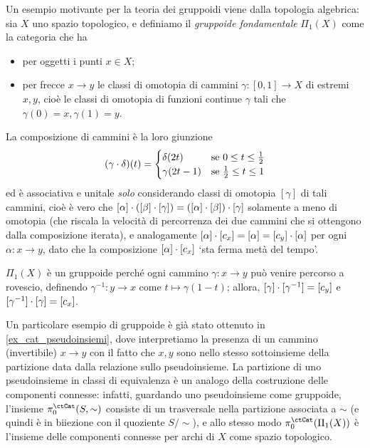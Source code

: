 \begin{definition}\label{es_gruppoide_fondamentale}
 Un esempio motivante per la teoria dei gruppoidi viene dalla topologia algebrica: sia \(X\) uno spazio topologico, e definiamo il \emph{gruppoide fondamentale} \(\Pi_1(X)\) come la categoria che ha
 \begin{itemize}
  \item per oggetti i punti \(x\in X\);
  \item per frecce \(x\to y\) le classi di omotopia di cammini \(\gamma \colon [0,1] \to X\) di estremi \(x,y\), cioè le classi di omotopia di funzioni continue \(\gamma\) tali che \(\gamma(0)=x, \gamma(1)=y\).
 \end{itemize}
 La composizione di cammini è la loro giunzione
 \[
  (\gamma\cdot \delta)(t) =
  \begin{cases}
   \delta(2t)   & \text{se } 0\le t\le \frac 12  \\
   \gamma(2t-1) & \text{se } \frac 12 \le t\le 1 \\
  \end{cases}\]
 ed è associativa e unitale \emph{solo} considerando classi di omotopia \([\gamma]\) di tali cammini, cioè è vero che \([\alpha] \cdot \left([\beta] \cdot [\gamma]\right) = \left([\alpha] \cdot [\beta]\right) \cdot [\gamma]\) solamente a meno di omotopia (che riscala la velocità di percorrenza dei due cammini che si ottengono dalla composizione iterata), e analogamente \([\alpha]\cdot [c_x] = [\alpha] = [c_y]\cdot [\alpha]\) per ogni \(\alpha \colon x\to y\), dato che la composizione \([\alpha]\cdot [c_x]\) `sta ferma metà del tempo'.

 \(\Pi_1(X)\) è un gruppoide perché ogni cammino \(\gamma \colon x\to y\) può venire percorso a rovescio, definendo \(\gamma^{-1} \colon y\to x\) come \(t\mapsto\gamma(1-t)\); allora, \([\gamma]\cdot[\gamma^{-1}] = [c_y]\) e \([\gamma^{-1}]\cdot [\gamma] = [c_x]\).
\end{definition}
Un particolare esempio di gruppoide è già stato ottenuto in \ref{ex_cat_pseudoinsiemi}, dove interpretiamo la presenza di un cammino (invertibile) \(x\to y\) con il fatto che \(x,y\) sono nello stesso sottoinsieme della partizione data dalla relazione sullo pseudoinsieme. La partizione di uno pseudoinsieme in classi di equivalenza è un analogo della costruzione delle componenti connesse: infatti, guardando uno pseudoinsieme come gruppoide, l'insieme \(\pi_0^\ctCat(S,\sim)\) consiste di un trasversale nella partizione associata a \(\sim\) (e quindi è in biiezione con il quoziente \(S/\sim\)), e allo stesso modo \(\pi_0^\ctCat(\Pi_1(X))\) è l'insieme delle componenti connesse per archi di \(X\) come spazio topologico.

